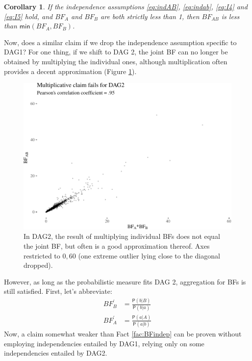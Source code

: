 \documentclass[
  10pt,
  dvipsnames,enabledeprecatedfontcommands]{scrartcl}
\newcommand{\pr}[1]{\ensuremath{\mathsf{P}(#1)}}
\newtheorem{corollary}{Corollary}[fact]
\begin{document}
\begin{corollary} If the independence assumptions \eqref{eq:indAB}, \eqref{eq:indab}, \eqref{eq:I4} and \eqref{eq:I5} hold, and $BF_{A}$ and $BF_{B}$ are both strictly less than 1, then $BF_{AB}$  is less than  $\mathsf{min}(BF_{A}, BF_{B})$. \label{cor:BFind3}
\end{corollary}

Now, does a similar claim if we drop the independence assumption
specific to \textsf{DAG1}? For one thing, if we shift to \textsf{DAG 2},
the joint \textsf{BF} can no longer be obtained by multiplying the
individual ones, although multiplication often provides a decent
approximation (Figure \ref{fig:BFmulti}).

\begin{figure}[H]

\begin{center}\includegraphics[width=1\linewidth]{conjunction-appendix13_files/figure-latex/unnamed-chunk-10-1} \end{center}
\caption{In DAG2, the result of multiplying individual BFs does not equal the joint BF, but often is a good approximation thereof. Axes restricted to $0,60$ (one extreme outlier lying close to the diagonal dropped).}
\label{fig:BFmulti}
\end{figure}

However, as long as the probabilistic measure fits \textsf{DAG 2},
aggregation for \textsf{BF}s is still satisfied. First, let's
abbreviate: \begin{align*}
BF^{'}_{B} & = \frac{\pr{b \vert B}}{\pr{b\vert a}} \\
BF^{'}_{A} & = \frac{\pr{a \vert A}}{\pr{a \vert b}}
\end{align*} \noindent Now, a claim somewhat weaker than Fact
\ref{fac:BFindep} can be proven without employing independencies
entailed by \textsf{DAG1}, relying only on some independencies entailed
by \textsf{DAG2}.
\end{document}
